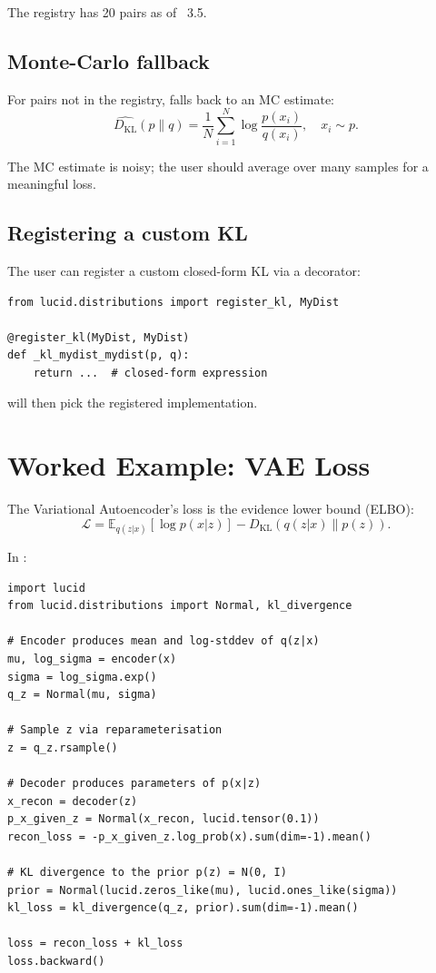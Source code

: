 The registry has 20 pairs as of \Lucid\ 3.5.

\subsection{Monte-Carlo fallback}
\label{ssec:distributions:mc_kl}

For pairs not in the registry,  falls
back to an MC estimate:
\[
\widehat{D_{\text{KL}}}(p \| q) = \frac{1}{N} \sum_{i=1}^N \log
\frac{p(x_i)}{q(x_i)}, \quad x_i \sim p.
\]

The MC estimate is noisy; the user should average over many
samples for a meaningful loss.

\subsection{Registering a custom KL}
\label{ssec:distributions:custom_kl}

The user can register a custom closed-form KL via a decorator:

\begin{lstlisting}[style=lucid,language=LucidPython]
from lucid.distributions import register_kl, MyDist

@register_kl(MyDist, MyDist)
def _kl_mydist_mydist(p, q):
    return ...  # closed-form expression
\end{lstlisting}

 will then pick the registered
implementation.

\section{Worked Example: VAE Loss}
\label{sec:distributions:vae_example}

The Variational Autoencoder's loss is the evidence lower bound
(ELBO):
\[
\mathcal{L} = \mathbb{E}_{q(z|x)}[\log p(x|z)] -
D_{\text{KL}}(q(z|x) \| p(z)).
\]

In \Lucid:

\begin{lstlisting}[style=lucid,language=LucidPython]
import lucid
from lucid.distributions import Normal, kl_divergence

# Encoder produces mean and log-stddev of q(z|x)
mu, log_sigma = encoder(x)
sigma = log_sigma.exp()
q_z = Normal(mu, sigma)

# Sample z via reparameterisation
z = q_z.rsample()

# Decoder produces parameters of p(x|z)
x_recon = decoder(z)
p_x_given_z = Normal(x_recon, lucid.tensor(0.1))
recon_loss = -p_x_given_z.log_prob(x).sum(dim=-1).mean()

# KL divergence to the prior p(z) = N(0, I)
prior = Normal(lucid.zeros_like(mu), lucid.ones_like(sigma))
kl_loss = kl_divergence(q_z, prior).sum(dim=-1).mean()

loss = recon_loss + kl_loss
loss.backward()
\end{lstlisting}

